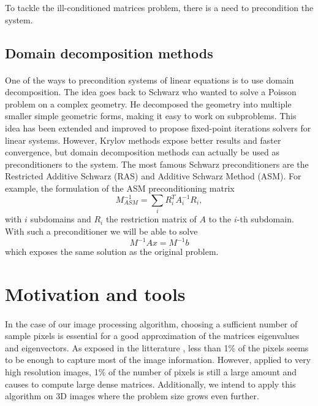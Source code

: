 To tackle the ill-conditioned matrices problem, there is a need to precondition the system.

\subsection{Domain decomposition methods}

\paragraph{}
One of the ways to precondition systems of linear equations is to use domain decomposition.
The idea goes back to Schwarz who wanted to solve a Poisson problem on a complex geometry.
He decomposed the geometry into multiple smaller simple geometric forms, making it easy to work on subproblems.
This idea has been extended and improved to propose fixed-point iterations solvers for linear systems.
However, Krylov methods expose better results and faster convergence, but domain decomposition methods can actually be used as preconditioners to the system.
The most famous Schwarz preconditioners are the Restricted Additive Schwarz (RAS) and Additive Schwarz Method (ASM).
For example, the formulation of the ASM preconditioning matrix
\[M^{-1}_{ASM} = \sum_i R_i^T A_i^{-1} R_i,\]
with \(i\) subdomains and \(R_i\) the restriction matrix of \(A\) to the \(i\)-th subdomain.
With such a preconditioner we will be able to solve
\[M^{-1}Ax = M^{-1}b\]
which exposes the same solution as the original problem.

\section{Motivation and tools}

\paragraph{}
In the case of our image processing algorithm, choosing a sufficient number of sample pixels is essential for a good approximation of the matrices eigenvalues and eigenvectors.
As exposed in the litterature \cite{glide_2014} \cite{fowlkes_spectral_2004}, less than 1\% of the pixels seems to be enough to capture most of the image information.
However, applied to very high resolution images, 1\% of the number of pixels is still a large amount and causes to compute large dense matrices.
Additionally, we intend to apply this algorithm on 3D images where the problem size grows even further.

